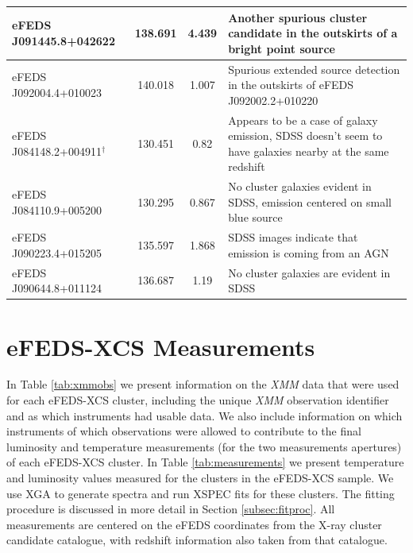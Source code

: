 \documentclass[fleqn,usenatbib]{mnras}
\begin{document}
\begin{table}
\begin{center}
\begin{tabular}{lcc|l}
\hline 
eFEDS J091445.8+042622 & 138.691 & 4.439 & Another spurious cluster candidate in the outskirts of a bright point source \\ 
\hline 
eFEDS J092004.4+010023 & 140.018 & 1.007 & Spurious extended source detection in the outskirts of eFEDS J092002.2+010220 \\ 
\hline
eFEDS J084148.2+004911$^{\dagger}$ & 130.451 & 0.82 & Appears to be a case of galaxy emission, SDSS doesn't seem to have galaxies nearby at the same redshift\\
\hline
eFEDS J084110.9+005200 & 130.295 & 0.867 & No cluster galaxies evident in SDSS, emission centered on small blue source\\
\hline
eFEDS J090223.4+015205 & 135.597 & 1.868 & SDSS images indicate that emission is coming from an AGN \\
\hline
eFEDS J090644.8+011124 & 136.687 & 1.19 & No cluster galaxies are evident in SDSS \\
\hline
\end{tabular}
\end{center}
\end{table}

\section{eFEDS-XCS Measurements}
\label{app:measurements}
In Table \ref{tab:xmmobs} we present information on the {\em XMM} data that were used for each eFEDS-XCS cluster, including the unique {\em XMM} observation identifier and as which instruments had usable data. We also include information on which instruments of which observations were allowed to contribute to the final luminosity and temperature measurements (for the two measurements apertures) of each eFEDS-XCS cluster. 
In Table \ref{tab:measurements} we present temperature and luminosity values measured for the clusters in the eFEDS-XCS sample. We use XGA to generate spectra and run XSPEC fits for these clusters. The fitting procedure is discussed in more detail in Section \ref{subsec:fitproc}. All measurements are centered on the eFEDS coordinates from the X-ray cluster candidate catalogue, with redshift information also taken from that catalogue.
\end{document}
